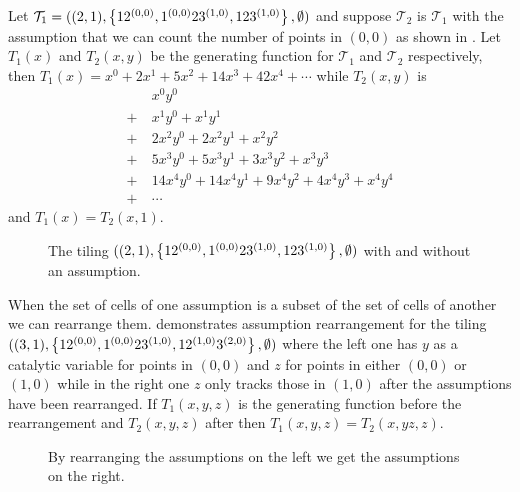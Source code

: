 Let $\mathcal{T}_1 = ((2,1),\left\{12^{(0,0)},1^{(0,0)}23^{(1,0)},123^{(1,0)}\right\},\emptyset)$ and suppose $\mathcal{T}_2$ is $\mathcal{T}_1$ with the assumption that we can count the number of points in $(0,0)$ as shown in . Let $T_1(x)$ and $T_2(x,y)$ be the generating function for $\mathcal{T}_1$ and $\mathcal{T}_2$ respectively, then $T_1(x) = x^0 + 2x^1 + 5x^2 + 14x^3 + 42x^4 + \dotsm$ while $T_2(x,y)$ is
\begin{align*}
    &\ x^0y^0\\
    + &\ x^1y^0 + x^1y^1\\
    + &\ 2x^2y^0 + 2x^2y^1 + x^2y^2\\
    + &\ 5x^3y^0 + 5x^3y^1 + 3x^3y^2 + x^3y^3\\
    + &\ 14x^4y^0 + 14x^4y^1 + 9x^4y^2 + 4x^4y^3 + x^4y^4\\
    + &\ \dotsm  
\end{align*}
and $T_1(x) = T_2(x,1)$.

\begin{figure}[ht!]
    \centering
    
    \caption{The tiling $((2,1),\left\{12^{(0,0)},1^{(0,0)}23^{(1,0)},123^{(1,0)}\right\},\emptyset)$ with and without an assumption.}
    \label{fig:addassumption}
\end{figure}

When the set of cells of one assumption is a subset of the set of cells of another we can rearrange them.  demonstrates assumption rearrangement for the tiling $((3,1),\left\{12^{(0,0)},1^{(0,0)}23^{(1,0)},12^{(1,0)}3^{(2,0)}\right\},\emptyset)$ where the left one has $y$ as a catalytic variable for points in $(0,0)$ and $z$ for points in either $(0,0)$ or $(1,0)$ while in the right one $z$ only tracks those in $(1,0)$ after the assumptions have been rearranged. If $T_1(x,y,z)$ is the generating function before the rearrangement and $T_2(x,y,z)$ after then $T_1(x,y,z) = T_2(x,yz,z)$.

\begin{figure}[ht!]
    \centering
    
    \caption{By rearranging the assumptions on the left we get the assumptions on the right.}
    \label{fig:assrear}
\end{figure}


